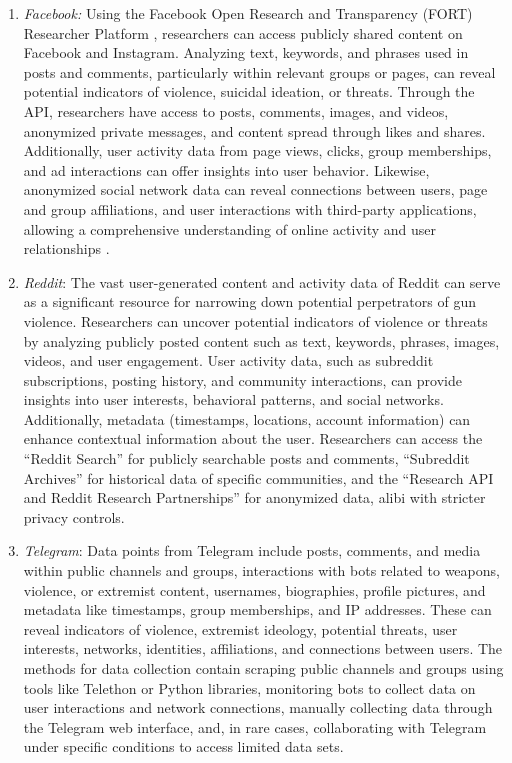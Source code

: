 \documentclass[11pt]{article}
\begin{document}
\begin{enumerate}
    \item \textit{Facebook:} Using the Facebook Open Research and Transparency (FORT) Researcher Platform \cite{fort_platform_2023}, researchers can access publicly shared content on Facebook and Instagram. Analyzing text, keywords, and phrases used in posts and comments, particularly within relevant groups or pages, can reveal potential indicators of violence, suicidal ideation, or threats. Through the API, researchers have access to posts, comments, images, and videos, anonymized private messages, and content spread through likes and shares. Additionally, user activity data from page views, clicks, group memberships, and ad interactions can offer insights into user behavior. Likewise, anonymized social network data can reveal connections between users, page and group affiliations, and user interactions with third-party applications, allowing a comprehensive understanding of online activity and user relationships \cite{fort_researcher_api_2019}.
    \item \textit{Reddit}: The vast user-generated content and activity data of Reddit can serve as a significant resource for narrowing down potential perpetrators of gun violence. Researchers can uncover potential indicators of violence or threats by analyzing publicly posted content such as text, keywords, phrases, images, videos, and user engagement. User activity data, such as subreddit subscriptions, posting history, and community interactions, can provide insights into user interests, behavioral patterns, and social networks. Additionally, metadata (timestamps, locations, account information) can enhance contextual information about the user. Researchers can access the ``Reddit Search''\cite{reddit_search_API,proferes2021studying,medvedev2019anatomy} for publicly searchable posts and comments, ``Subreddit Archives''\cite{proferes2021studying} for historical data of specific communities, and the ``Research API and Reddit Research Partnerships''\cite{rocha2023passive} for anonymized data, alibi with stricter privacy controls.
    \item \textit{Telegram}: Data points from Telegram \cite{telegram} include posts, comments, and media within public channels and groups, interactions with bots related to weapons, violence, or extremist content, usernames, biographies, profile pictures, and metadata like timestamps, group memberships, and IP addresses. These can reveal indicators of violence, extremist ideology, potential threats, user interests, networks, identities, affiliations, and connections between users. The methods for data collection contain scraping public channels and groups using tools like Telethon \cite{telethon} or Python libraries, monitoring bots to collect data on user interactions and network connections, manually collecting data through the Telegram web interface, and, in rare cases, collaborating with Telegram under specific conditions to access limited data sets\cite{telegram_privacy,telegram_tos}.

\end{enumerate}
\end{document}
